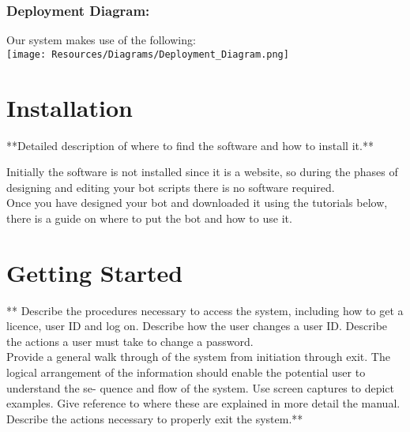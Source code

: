 \documentclass{article}
\begin{document}
\subsubsection*{Deployment Diagram:}
Our system makes use of the following:\\
\texttt{[image: Resources/Diagrams/Deployment\_Diagram.png]}
\newpage

\section{Installation}
**Detailed description of where to find the software and how to install it.**\\
\begin{flushleft}
Initially the software is not installed since it is a website, so during the phases of designing and editing your bot scripts there is no software required.\\
Once you have designed your bot and downloaded it using the tutorials below, there is a guide on where to put the bot and how to use it.
\end{flushleft}

\section{Getting Started}
** Describe the procedures necessary to access the system, including how to get a licence,
user ID and log on. Describe how the user changes a user ID. Describe the actions a user
must take to change a password.\\
Provide a general walk through of the system from initiation through exit. The logical
arrangement of the information should enable the potential user to understand the se-
quence and flow of the system. Use screen captures to depict examples. Give reference
to where these are explained in more detail the manual.\\
Describe the actions necessary to properly exit the system.** 
\end{document}
